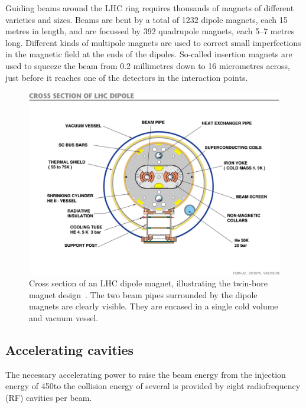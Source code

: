 Guiding beams around the LHC ring requires thousands of magnets of different varieties and sizes.
Beams are bent by a total of 1232 dipole magnets, each 15 metres in length, and are focussed by 392
quadrupole magnets, each 5–7 metres long. Different kinds of multipole magnets are used to correct
small imperfections in the magnetic field at the ends of the dipoles. So-called insertion magnets
are used to squeeze the beam from 0.2 millimetres down to 16 micrometres across, just before it
reaches one of the detectors in the interaction points. 

\begin{figure}[t]
  \centering
  \includegraphics[width=\textwidth,clip=true,trim=0 2cm 0 2cm]
  {figures/lhc/lhc_dipole_cross_section_cds841539.jpg} 
  \caption{Cross section of an LHC dipole magnet, illustrating the twin-bore magnet
design~\cite{cds:841539}. The two beam pipes surrounded by the dipole magnets are clearly
visible. They are encased in a single cold volume and vacuum vessel. 
  \label{fig:lhc_twin_bore}}
\end{figure}


\subsection{Accelerating cavities}

The necessary accelerating power to raise the beam energy from the injection energy of 450\GeV to
the collision energy of several \TeV is provided by eight radiofrequency (RF) cavities per beam. 

